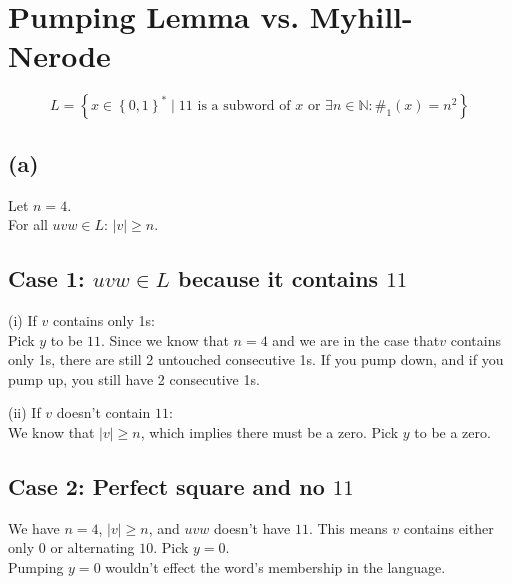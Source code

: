 



\setcounter{section}{2}

\section{Pumping Lemma vs. Myhill-Nerode}

$$L = \left\{ x \in \left\{0,1\right\}^{\ast} \mid 11\text{ is a subword of }x\text{ or } \exists n \in \mathbb{N}:\#_{1}(x)=n^{2}\right\}$$

\subsection{(a)}
Let \( n = 4 \). \\
For all \( uvw \in L \): \( |v| \geq n \).

\subsection*{Case 1: \( uvw \in L \) because it contains \( 11 \)}


    (i) If \( v \) contains only 1s:\\ Pick \( y \) to be \( 11 \). Since we know that \( n = 4 \) and we are in the case that\( v \) contains only 1s, there are still 2 untouched consecutive 1s. If you pump down, and if you pump up, you still have 2 consecutive 1s.
    
    (ii) If \( v \) doesn’t contain \( 11 \):\\
        We know that \( |v| \geq n \), which implies there must be a zero. Pick \( y \) to be a zero.
    


\subsection*{Case 2: Perfect square and no \( 11 \)}

We have \( n = 4 \), \( |v| \geq n \), and \( uvw \) doesn’t have \( 11 \). This means \( v \) contains either only 0 or alternating \( 10 \). Pick \( y = 0 \).\\
Pumping \( y = 0 \) wouldn’t effect the word’s membership in the language.


